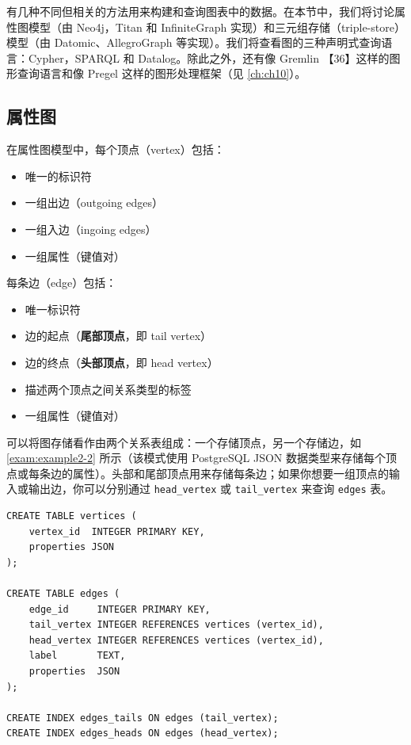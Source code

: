 有几种不同但相关的方法用来构建和查询图表中的数据。在本节中，我们将讨论属性图模型（由 Neo4j，Titan 和 InfiniteGraph 实现）和三元组存储（triple-store）模型（由 Datomic、AllegroGraph 等实现）。我们将查看图的三种声明式查询语言：Cypher，SPARQL 和 Datalog。除此之外，还有像 Gremlin 【36】这样的图形查询语言和像 Pregel 这样的图形处理框架（见 \autoref{ch:ch10}）。

\subsection{属性图}

在属性图模型中，每个顶点（vertex）包括：

\begin{itemize}
    \item 唯一的标识符
    \item 一组出边（outgoing edges）
    \item 一组入边（ingoing edges）
    \item 一组属性（键值对）
\end{itemize}

每条边（edge）包括：

\begin{itemize}
    \item 唯一标识符
    \item 边的起点（\textbf{尾部顶点}，即 tail vertex）
    \item 边的终点（\textbf{头部顶点}，即 head vertex）
    \item 描述两个顶点之间关系类型的标签
    \item 一组属性（键值对）
\end{itemize}

可以将图存储看作由两个关系表组成：一个存储顶点，另一个存储边，如 \autoref{exam:example2-2} 所示（该模式使用 PostgreSQL JSON 数据类型来存储每个顶点或每条边的属性）。头部和尾部顶点用来存储每条边；如果你想要一组顶点的输入或输出边，你可以分别通过 \texttt{head\_vertex} 或 \texttt{tail\_vertex} 来查询 \texttt{edges} 表。

\label{exam:example2-2}
\begin{lstlisting}[caption={使用关系模式来表示属性图}]
CREATE TABLE vertices (
    vertex_id  INTEGER PRIMARY KEY,
    properties JSON
);

CREATE TABLE edges (
    edge_id     INTEGER PRIMARY KEY,
    tail_vertex INTEGER REFERENCES vertices (vertex_id),
    head_vertex INTEGER REFERENCES vertices (vertex_id),
    label       TEXT,
    properties  JSON
);

CREATE INDEX edges_tails ON edges (tail_vertex);
CREATE INDEX edges_heads ON edges (head_vertex);
\end{lstlisting}

